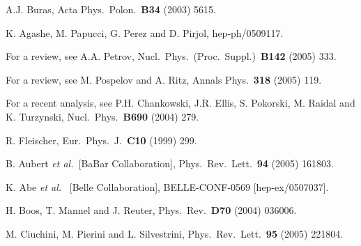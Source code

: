 \documentclass[12pt]{article}
\begin{document}
\begin{thebibliography}{999}
  A.J. Buras,
  { Acta Phys.\ Polon.}~{\bf B34} (2003) 5615.
  
K. Agashe, M. Papucci, G. Perez and D. Pirjol,
hep-ph/0509117.

For a review, see A.A. Petrov,
  { Nucl.\ Phys.\ (Proc.\ Suppl.)}~{\bf B142} (2005) 333.

For a review, see M. Pospelov and A. Ritz,
  { Annals Phys.}~{\bf 318} (2005) 119.
 
For a recent analysis, see
P.H. Chankowski, J.R. Ellis, S. Pokorski, M. Raidal and K. Turzynski,
  { Nucl.\ Phys.}~{\bf B690} (2004) 279.

R. Fleischer,
  { Eur.\ Phys.\ J.}~{\bf C10} (1999) 299.

B. Aubert {\it et al.}\  [BaBar Collaboration],
    { Phys.\ Rev.\ Lett.}~{\bf 94} (2005) 161803.

K. Abe {\it et al.} \ [Belle Collaboration],
  BELLE-CONF-0569 [hep-ex/0507037].

H. Boos, T. Mannel and J. Reuter,
  { Phys.\ Rev.}~{\bf D70} (2004) 036006.
  
M. Ciuchini, M. Pierini and L. Silvestrini,
  Phys.\ Rev.\ Lett.\  {\bf 95} (2005) 221804.
  

\end{thebibliography}
\end{document}
